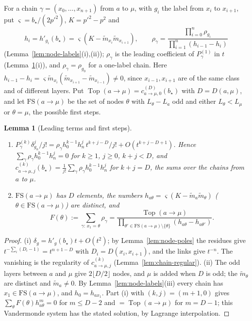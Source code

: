 \documentclass[twoside,10pt]{article}
\numberwithin{equation}{section}
\theoremstyle{slbody}
\newtheorem{lemma}[theorem]{Lemma}
\theoremstyle{definition}
\theoremstyle{remark}
\begin{document}
For a chain $\gamma=(x_0,\dots,x_{n+1})$ from $a$ to $\mu$, with $g_i$ the label
from $x_i$ to $x_{i+1}$, put $\varsigma=b_\star/(2p'^2)$, $K=p'^2-p^2$ and
\[
 h_i=h'_{g_i}(b_\star)=\varsigma(K-\tilde m_{x_i}\tilde m_{x_{i+1}}),\qquad
 \rho_\gamma=\frac{\prod_{i=0}^n\rho_{g_i}}{\prod_{i=1}^n(h_{i-1}-h_i)}
\]
(Lemma~\ref{lem:node-labels}(i),(ii)); $\rho_\gamma$ is the leading coefficient
of $P^{(1)}_\gamma$ in $t$ (Lemma~\ref{lem:node-leading}(i)), and
$\rho_\gamma=\rho_{g_0}$ for a one-label chain.  Here $h_{i-1}-h_i=\varsigma \tilde m_{x_i}(\tilde m_{x_{i+1}}-\tilde m_{x_{i-1}})\neq0$, since
$x_{i-1},x_{i+1}$ are of the same class and of different layers.  Put
$\operatorname{Top}(a\to\mu)=c^{(D)}_{a\to\mu,0}(b_\star)$ with $D=D(a,\mu)$,
and let $\mathrm{FS}(a\to\mu)$ be the set of nodes $\theta$ with $L_\theta-L_a$
odd and either $L_\theta<L_\mu$ or $\theta=\mu$, the possible first steps.

\begin{lemma}[Leading terms and first steps]\label{lem:node-leading}
\begin{enumerate}
\item[(i)]
$P^{(k)}_\gamma\delta_{g_n}^j/j!=\rho_\gamma h_0^{k-1}h_n^j\,t^{k+j-D}/j!
+O(t^{k+j-D+1})$.  Hence $\sum_\gamma \rho_\gamma h_0^{k-1}h_n^j=0$ for
$k\geq1$, $j\geq0$, $k+j<D$, and
$c^{(k)}_{a\to\mu,j}(b_\star)=\frac1{j!}\sum_\gamma \rho_\gamma h_0^{k-1}h_n^j$ for
$k+j=D$, the sums over the chains from $a$ to $\mu$.
\item[(ii)] $\mathrm{FS}(a\to\mu)$ has $D$ elements, the numbers
$h_{a\theta}=\varsigma(K-\tilde m_a\tilde m_\theta)$ ($\theta\in\mathrm{FS}(a\to\mu)$) are distinct,
and
\[
 F(\theta):=\sum_{\gamma:\,x_1=\theta}\rho_\gamma
 =\frac{\operatorname{Top}(a\to\mu)}
 {\prod_{\theta'\in\mathrm{FS}(a\to\mu)\setminus\{\theta\}}(h_{a\theta}-h_{a\theta'})}.
\]
\end{enumerate}
\end{lemma}

\begin{proof}
(i) $\delta_g=h'_g(b_\star)t+O(t^2)$; by Lemma~\ref{lem:node-poles} the residues
give $t^{-\sum_i(D_i-1)}=t^{n+1-D}$ with $D_i=D(x_i,x_{i+1})$, and
the links give $t^{-n}$.  The vanishing is the regularity of
$c^{(k)}_{a\to\mu,j}$ (Lemma~\ref{lem:chain-regular}).  (ii) The odd layers
between $a$ and $\mu$ give $2\lfloor D/2\rfloor$ nodes, and $\mu$ is added when
$D$ is odd; the $\tilde m_\theta$ are distinct and $\tilde m_a\neq0$.  By
Lemma~\ref{lem:node-labels}(iii) every chain has $x_1\in\mathrm{FS}(a\to\mu)$,
and $h_0=h_{ax_1}$.  Part (i) with $(k,j)=(m+1,0)$ gives
$\sum_\theta F(\theta)h_{a\theta}^m=0$ for $m\leq D-2$ and
$=\operatorname{Top}(a\to\mu)$ for $m=D-1$; this Vandermonde system has the
stated solution, by Lagrange interpolation.
\end{proof}
\end{document}
